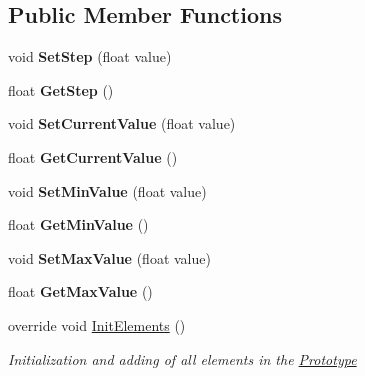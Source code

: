 \subsection*{Public Member Functions}
\begin{DoxyCompactItemize}
\item 
\mbox{\label{class_space_v_i_l_1_1_vertical_slider_a12eb440bb08e00f9e0c611ca4377f2df}} 
void {\bfseries Set\+Step} (float value)
\item 
\mbox{\label{class_space_v_i_l_1_1_vertical_slider_a261cc4ef533e8000f2b78f98e84cf69a}} 
float {\bfseries Get\+Step} ()
\item 
\mbox{\label{class_space_v_i_l_1_1_vertical_slider_a2210116ef1046c4abdb047271a02849c}} 
void {\bfseries Set\+Current\+Value} (float value)
\item 
\mbox{\label{class_space_v_i_l_1_1_vertical_slider_a1f4e2ee3101ecfcb0621a657d000feb1}} 
float {\bfseries Get\+Current\+Value} ()
\item 
\mbox{\label{class_space_v_i_l_1_1_vertical_slider_a251e736539ac13eca1febefaef0b44ea}} 
void {\bfseries Set\+Min\+Value} (float value)
\item 
\mbox{\label{class_space_v_i_l_1_1_vertical_slider_ad7f898117dbae50c5ebe00418c80c689}} 
float {\bfseries Get\+Min\+Value} ()
\item 
\mbox{\label{class_space_v_i_l_1_1_vertical_slider_adb5ef8f273daa3cfd4607b644c44866d}} 
void {\bfseries Set\+Max\+Value} (float value)
\item 
\mbox{\label{class_space_v_i_l_1_1_vertical_slider_ad1a42ca80d41a1c5dc51480df5f5c360}} 
float {\bfseries Get\+Max\+Value} ()
\item 
override void \mbox{\hyperlink{class_space_v_i_l_1_1_vertical_slider_a22ab138c5fbb0bdc8c56f7673998dfcb}{Init\+Elements}} ()
\begin{DoxyCompactList}\small\item\em Initialization and adding of all elements in the \mbox{\hyperlink{class_space_v_i_l_1_1_prototype}{Prototype}} \end{DoxyCompactList}\item 

\end{DoxyCompactItemize}
